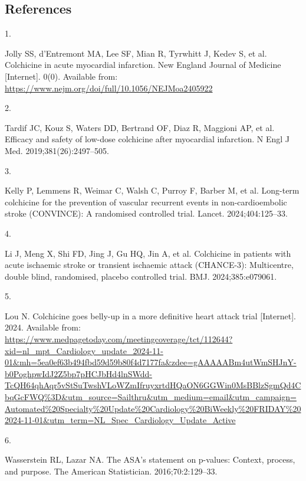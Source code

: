\documentclass[
  letterpaper,
  DIV=11,
  numbers=noendperiod]{scrartcl}
\newlength{\cslhangindent}
\newlength{\csllabelwidth}
\newenvironment{CSLReferences}[2] %
 {\begin{list}{}{%
  \setlength{\itemindent}{0pt}
  \setlength{\leftmargin}{0pt}
  \setlength{\parsep}{0pt}
  \ifodd #1
   \setlength{\leftmargin}{\cslhangindent}
   \setlength{\itemindent}{-1\cslhangindent}
  \fi
  \setlength{\itemsep}{#2\baselineskip}}}
 {\end{list}}
\newcommand{\CSLLeftMargin}[1]{\parbox[t]{\csllabelwidth}{\strut#1\strut}}
\newcommand{\CSLRightInline}[1]{\parbox[t]{\linewidth - \csllabelwidth}{\strut#1\strut}}
\begin{document}
\subsection*{References}\label{references}

\label{refs}
\begin{CSLReferences}{0}{1}
\CSLLeftMargin{1. }%
\CSLRightInline{Jolly SS, d'Entremont MA, Lee SF, Mian R, Tyrwhitt J,
Kedev S, et al. Colchicine in acute myocardial infarction. New England
Journal of Medicine {[}Internet{]}. 0(0). Available from:
\url{https://www.nejm.org/doi/full/10.1056/NEJMoa2405922}}

\CSLLeftMargin{2. }%
\CSLRightInline{Tardif JC, Kouz S, Waters DD, Bertrand OF, Diaz R,
Maggioni AP, et al. Efficacy and safety of low-dose colchicine after
myocardial infarction. N Engl J Med. 2019;381(26):2497--505. }

\CSLLeftMargin{3. }%
\CSLRightInline{Kelly P, Lemmens R, Weimar C, Walsh C, Purroy F, Barber
M, et al. Long-term colchicine for the prevention of vascular recurrent
events in non-cardioembolic stroke (CONVINCE): A randomised controlled
trial. Lancet. 2024;404:125--33. }

\CSLLeftMargin{4. }%
\CSLRightInline{Li J, Meng X, Shi FD, Jing J, Gu HQ, Jin A, et al.
Colchicine in patients with acute ischaemic stroke or transient
ischaemic attack (CHANCE-3): Multicentre, double blind, randomised,
placebo controlled trial. BMJ. 2024;385:e079061. }

\CSLLeftMargin{5. }%
\CSLRightInline{Lou N. Colchicine goes belly-up in a more definitive
heart attack trial {[}Internet{]}. 2024. Available from:
\url{https://www.medpagetoday.com/meetingcoverage/tct/112644?xid=nl_mpt_Cardiology_update_2024-11-01&mh=5ea0ef63b494fbd59d59b80f4d7177fa&zdee=gAAAAABm4utWmSHJnY-b0PoghpwIdJ2Z5bp7pHCJbHd4lnSWdd-TcQH64qhAqr5vStSuTwshVLoWZmIfruyxrtdHQaON6GGWin0MsBBlzSgmQd4CbqGcFWQ\%3D&utm_source=Sailthru&utm_medium=email&utm_campaign=Automated\%20Specialty\%20Update\%20Cardiology\%20BiWeekly\%20FRIDAY\%202024-11-01&utm_term=NL_Spec_Cardiology_Update_Active}}

\CSLLeftMargin{6. }%
\CSLRightInline{Wasserstein RL, Lazar NA. The ASA's statement on
p-values: Context, process, and purpose. The American Statistician.
2016;70:2:129--33. }


\end{CSLReferences}
\end{document}
